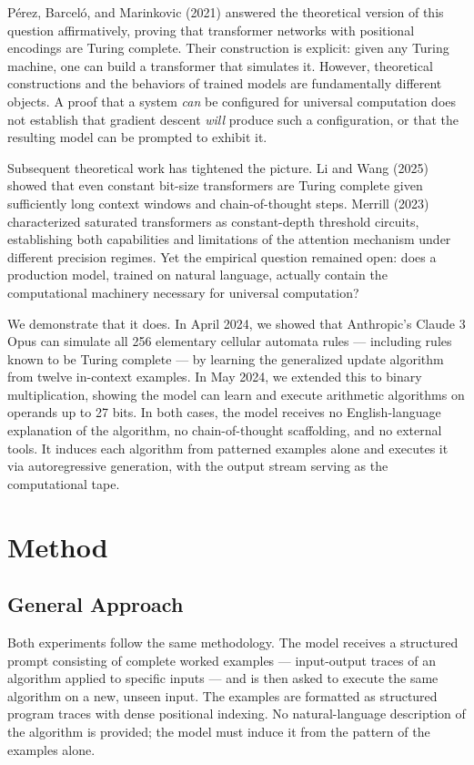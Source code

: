 \documentclass[twocolumn,switch,10pt]{article}
\begin{document}
Pérez, Barceló, and Marinkovic (2021) answered the theoretical version of this question affirmatively, proving that transformer networks with positional encodings are Turing complete. Their construction is explicit: given any Turing machine, one can build a transformer that simulates it. However, theoretical constructions and the behaviors of trained models are fundamentally different objects. A proof that a system \emph{can} be configured for universal computation does not establish that gradient descent \emph{will} produce such a configuration, or that the resulting model can be prompted to exhibit it.

Subsequent theoretical work has tightened the picture. Li and Wang (2025) showed that even constant bit-size transformers are Turing complete given sufficiently long context windows and chain-of-thought steps. Merrill (2023) characterized saturated transformers as constant-depth threshold circuits, establishing both capabilities and limitations of the attention mechanism under different precision regimes. Yet the empirical question remained open: does a production model, trained on natural language, actually contain the computational machinery necessary for universal computation?

We demonstrate that it does. In April 2024, we showed that Anthropic's Claude 3 Opus can simulate all 256 elementary cellular automata rules --- including rules known to be Turing complete --- by learning the generalized update algorithm from twelve in-context examples. In May 2024, we extended this to binary multiplication, showing the model can learn and execute arithmetic algorithms on operands up to 27 bits. In both cases, the model receives no English-language explanation of the algorithm, no chain-of-thought scaffolding, and no external tools. It induces each algorithm from patterned examples alone and executes it via autoregressive generation, with the output stream serving as the computational tape.

\section{Method}\label{sec:method}

\subsection{General Approach}\label{general-approach}

Both experiments follow the same methodology. The model receives a structured prompt consisting of complete worked examples --- input-output traces of an algorithm applied to specific inputs --- and is then asked to execute the same algorithm on a new, unseen input. The examples are formatted as structured program traces with dense positional indexing. No natural-language description of the algorithm is provided; the model must induce it from the pattern of the examples alone.
\end{document}
